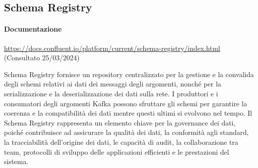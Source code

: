 \subsection{Schema Registry} \label{sec:schema_registry}
\paragraph{Documentazione} \href{https://docs.confluent.io/platform/current/schema-registry/index.html}{https://docs.confluent.io/platform/current/schema-registry/index.html} (Consultato 25/03/2024)


Schema Registry fornisce un repository centralizzato per la gestione e la convalida degli schemi relativi ai dati dei messaggi degli argomenti, nonché per la serializzazione e la deserializzazione dei dati sulla rete. I produttori e i consumatori degli argomenti Kafka possono sfruttare gli schemi per garantire la coerenza e la compatibilità dei dati mentre questi ultimi si evolvono nel tempo. Il Schema Registry rappresenta un elemento chiave per la governance dei dati, poiché contribuisce ad assicurare la qualità dei dati, la conformità agli standard, la tracciabilità dell'origine dei dati, le capacità di audit, la collaborazione tra team, protocolli di sviluppo delle applicazioni efficienti e le prestazioni del sistema.


